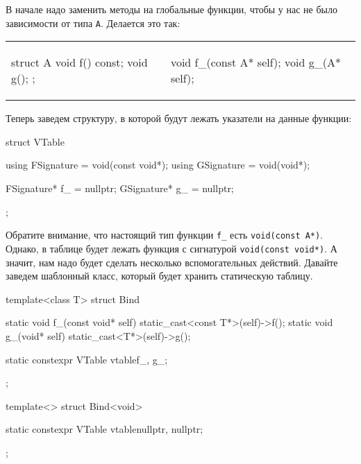 В начале надо заменить методы на глобальные функции, чтобы у нас не было зависимости от типа \texttt{A}.
Делается это так:
\begin{center}
\begin{tabular}{ll}
{
\begin{minipage}[\baselineskip]{5.4cm}
\begin{cppcode}[numbers = none]
struct A {
  void f() const;
  void g();  
};
\end{cppcode}
\end{minipage}
}&{
\begin{minipage}[\baselineskip]{5.35cm}
\begin{cppcode}[numbers = none]

void f_(const A* self);
void g_(A* self);  

\end{cppcode}
\end{minipage}
}\\
\end{tabular}
\end{center}
Теперь заведем структуру, в которой будут лежать указатели на данные функции:
\begin{center}
\begin{minipage}[\baselineskip]{11.2cm}
\begin{cppcode}
struct VTable {
  using FSignature = void(const void*);
  using GSignature = void(void*);

  FSignature* f_ = nullptr;
  GSignature* g_ = nullptr;
};
\end{cppcode}
\end{minipage}
\end{center}
Обратите внимание, что настоящий тип функции \texttt{f\_} есть \texttt{void(const A*)}.
Однако, в таблице будет лежать функция с сигнатурой \texttt{void(const void*)}.
А значит, нам надо будет сделать несколько вспомогательных действий.
Давайте заведем шаблонный класс, который будет хранить статическую таблицу.
\begin{center}
\begin{minipage}[\baselineskip]{11.2cm}
\begin{cppcode}
template<class T>
struct Bind {
static void f_(const void* self) {
  static_cast<const T*>(self)->f();
}
static void g_(void* self) {
  static_cast<T*>(self)->g();
}

static constexpr VTable vtable{f_, g_};
};

template<>
struct Bind<void> {

static constexpr VTable vtable{nullptr, nullptr};
};
\end{cppcode}
\end{minipage}
\end{center}
